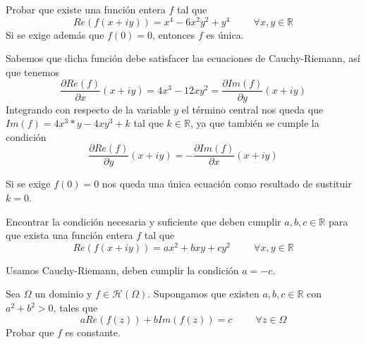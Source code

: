 \begin{ejer}
	Probar que existe una función entera $f$ tal que
	$$Re(f(x+iy)) = x^4-6x^2y^2+y^4 \hspace{1cm}\forall x,y\in\mathbb{R}$$
	Si se exige además que $f(0)=0$, entonces $f$ es única.
\end{ejer}
\begin{sol}
	Sabemos que dicha función debe satisfacer las ecuaciones de Cauchy-Riemann, así que tenemos
	$$ \frac{\partial Re(f)}{\partial x}(x+iy) = 4x^3-12xy^2 = \frac{\partial Im(f)}{\partial y}(x+iy) $$
	Integrando con respecto de la variable $y$ el término central nos queda que
	$Im(f) = 4x^3*y - 4xy^3+k$ tal que $k\in\mathbb{R}$, ya que también se cumple la condición 
	$$ \frac{\partial Re(f)}{\partial y} (x+iy) = -\frac{\partial Im(f)}{\partial x} (x+iy) $$
	
	Si se exige $f(0)=0$ nos queda una única ecuación como resultado de sustituir $k=0$.
\end{sol}

\begin{ejer}
	Encontrar la condición necesaria y suficiente que deben cumplir $a,b,c\in\mathbb{R}$ para que exista una función entera $f$ tal que
	$$ Re(f(x+iy)) = ax^2+bxy+cy^2\hspace{1cm}\forall x,y\in\mathbb{R} $$
\end{ejer}
Usamos Cauchy-Riemann, deben cumplir la condición $a=-c$.


\begin{ejer}
	Sea $\Omega$ un dominio y $f\in\mathcal{H}(\Omega)$. Supongamos que existen $a,b,c\in\mathbb{R}$ con $a^2+b^2>0$, tales que
	$$ aRe(f(z)) + bIm(f(z)) = c\hspace{1cm} \forall z\in\Omega $$
	Probar que $f$ es constante.
\end{ejer}

